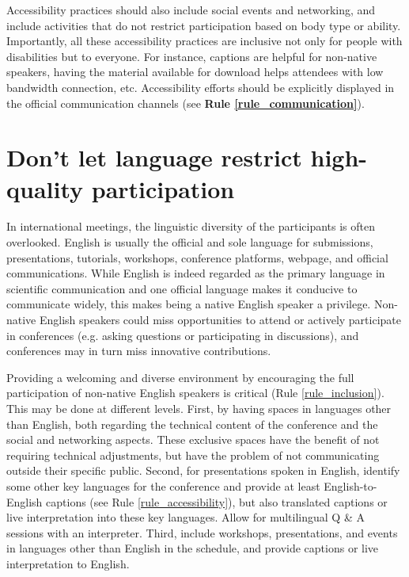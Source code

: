 \documentclass[10pt,letterpaper]{article}
\begin{document}
Accessibility practices should also include social events and networking, and include activities that do not restrict participation based on body type or ability. Importantly, all these accessibility practices are inclusive not only for people with disabilities but to everyone.
For instance, captions are helpful for non-native speakers, having the material available for download helps attendees with low bandwidth connection, etc. Accessibility efforts should be explicitly displayed in the official communication channels  (see \textbf{Rule \ref{rule_communication}}). 




\section{Don't let language restrict high-quality participation}
\label{rule_language}

In international meetings, the linguistic diversity of the participants is often overlooked. 
English is usually the official and sole language for submissions, presentations, tutorials, workshops, conference platforms, webpage, and official communications. 
While English is indeed regarded as the primary language in scientific communication and one official language makes it conducive to communicate widely, this makes being a native English speaker a privilege.
Non-native English speakers could miss opportunities to attend or actively participate in conferences (e.g. asking questions or participating in discussions),
and conferences may in turn miss innovative contributions.

Providing a welcoming and diverse environment by encouraging the full participation of non-native English speakers is critical (Rule \ref{rule_inclusion}). This may be done at different levels. First, by having spaces in languages other than English, both regarding the technical content of the conference and the social and networking aspects. These exclusive spaces have the benefit of not requiring technical adjustments, but have the problem of not communicating outside their specific public.   
Second, for presentations spoken in English, identify some other key languages for the conference and provide at least English-to-English captions (see Rule \ref{rule_accessibility}), but also translated captions or live interpretation into these key languages. Allow for multilingual Q \& A sessions with an interpreter. Third, include workshops, presentations, and events in languages other than English in the schedule, and provide captions or live interpretation to English. 
\end{document}
